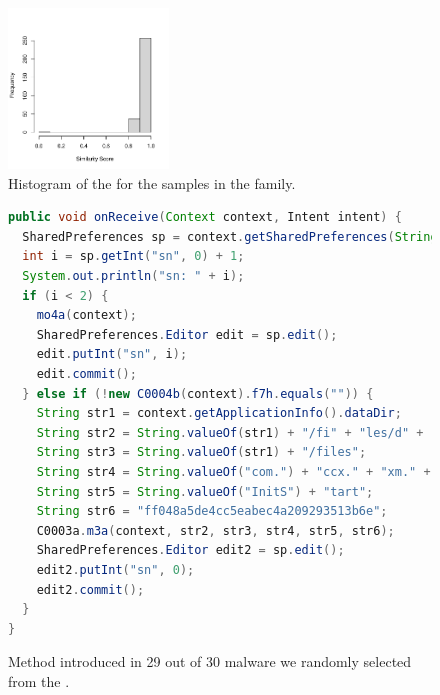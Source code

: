 \begin{figure}
\begin{center}
    \includegraphics[width=0.38\textwidth]{images/similarityGappusin.pdf}
  \end{center}
  \caption{Histogram of the \sscore for the samples in the \gps family.}
  \label{fig:hist-gappusin}
\end{figure}  

\begin{figure}
\begin{lstlisting}[language=Java]
public void onReceive(Context context, Intent intent) {
  SharedPreferences sp = context.getSharedPreferences(String.valueOf("com.") + "game." + "param", 0);
  int i = sp.getInt("sn", 0) + 1;
  System.out.println("sn: " + i);
  if (i < 2) {
    mo4a(context);
    SharedPreferences.Editor edit = sp.edit();
    edit.putInt("sn", i);
    edit.commit();
  } else if (!new C0004b(context).f7h.equals("")) {
    String str1 = context.getApplicationInfo().dataDir;
    String str2 = String.valueOf(str1) + "/fi" + "les/d" + "ata.a" + "pk";
    String str3 = String.valueOf(str1) + "/files";
    String str4 = String.valueOf("com.") + "ccx." + "xm." + "SDKS" + "tart";
    String str5 = String.valueOf("InitS") + "tart";
    String str6 = "ff048a5de4cc5eabec4a209293513b6e";    
    C0003a.m3a(context, str2, str3, str4, str5, str6);
    SharedPreferences.Editor edit2 = sp.edit();
    edit2.putInt("sn", 0);
    edit2.commit();
  }
}
\end{lstlisting}
\caption{Method introduced in 29 out of 30 \gps malware we randomly selected from the \cds.}
\label{code:onReceive}
\end{figure}

